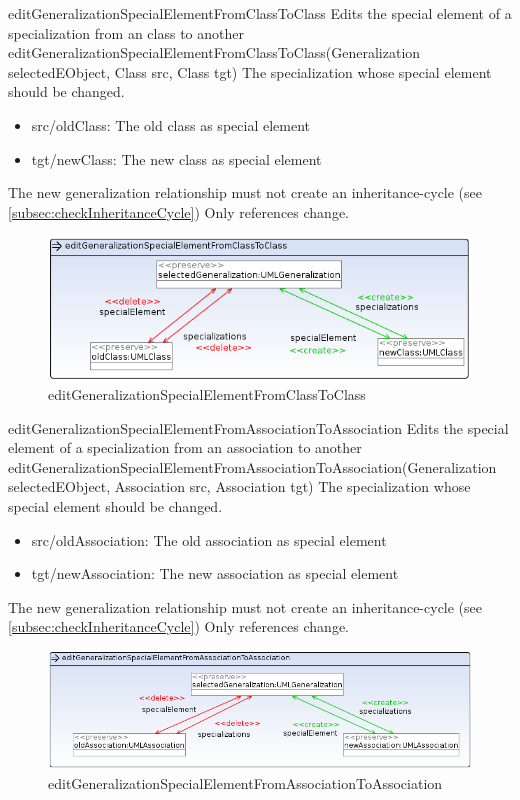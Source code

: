 \op
{editGeneralizationSpecialElementFromClassToClass}
{Edits the special element of a specialization from an class to
another}
{editGeneralizationSpecialElementFromClassToClass(Generalization
selectedEObject, Class src, Class tgt)}
{The specialization whose special element should be changed.} {
\begin{itemize}
 \item src/oldClass: The old class as special element
 \item tgt/newClass: The new class as special element
\end{itemize}
}
{The new generalization relationship must not create an inheritance-cycle (see
\ref{subsec:checkInheritanceCycle})}
{Only references change.}
\begin{figure}[H]
  \centering
  \includegraphics[width=1.0\textwidth]{pics/editGeneralizationSpecialElementFromClassToClass.png}
  \caption{editGeneralizationSpecialElementFromClassToClass}
  \label{editGeneralizationSpecialElementFromClassToClass}
\end{figure}
\op
{editGeneralizationSpecialElementFromAssociationToAssociation}
{Edits the special element of a specialization from an association to
another}
{editGeneralizationSpecialElementFromAssociationToAssociation(Generalization
selectedEObject, Association src, Association tgt)}
{The specialization whose special element should be changed.} {
\begin{itemize}
 \item src/oldAssociation: The old association as special element
 \item tgt/newAssociation: The new association as special element
\end{itemize}
}
{The new generalization relationship must not create an inheritance-cycle (see
\ref{subsec:checkInheritanceCycle})}
{Only references change.}
\begin{figure}[H]
  \centering
  \includegraphics[width=1.0\textwidth]{pics/editGeneralizationSpecialElementFromAssociationToAssociation.png}
  \caption{editGeneralizationSpecialElementFromAssociationToAssociation}
  \label{editGeneralizationSpecialElementFromAssociationToAssociation}
\end{figure}
